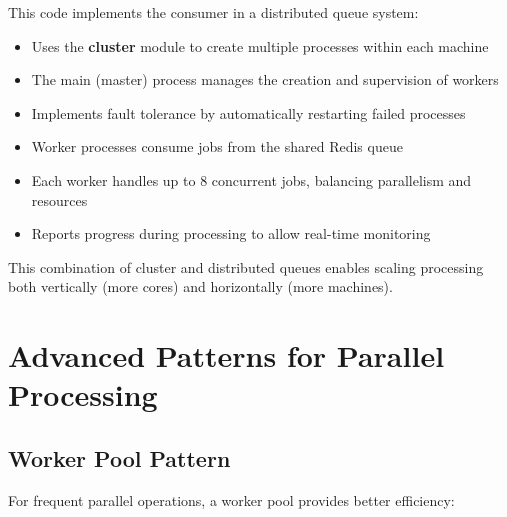 This code implements the consumer in a distributed queue system:
\begin{itemize}
    \item Uses the \textbf{\textcolor{accentColor}{cluster}} module to create multiple processes within each machine
    \item The main (master) process manages the creation and supervision of workers
    \item Implements fault tolerance by automatically restarting failed processes
    \item Worker processes consume jobs from the shared Redis queue
    \item Each worker handles up to 8 concurrent jobs, balancing parallelism and resources
    \item Reports progress during processing to allow real-time monitoring
\end{itemize}

This combination of cluster and distributed queues enables scaling processing both vertically (more cores) and horizontally (more machines).

\section{Advanced Patterns for Parallel Processing}

\subsection{Worker Pool Pattern}

For frequent parallel operations, a worker pool provides better efficiency:


